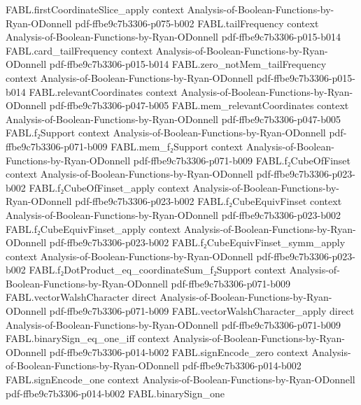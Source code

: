 \begin{theorem}
\proofstep
  {FABL.firstCoordinateSlice_apply}
  {context}
  {Analysis-of-Boolean-Functions-by-Ryan-ODonnell}
  {pdf-ffbe9c7b3306-p075-b002}
\proofstep
  {FABL.tailFrequency}
  {context}
  {Analysis-of-Boolean-Functions-by-Ryan-ODonnell}
  {pdf-ffbe9c7b3306-p015-b014}
\proofstep
  {FABL.card_tailFrequency}
  {context}
  {Analysis-of-Boolean-Functions-by-Ryan-ODonnell}
  {pdf-ffbe9c7b3306-p015-b014}
\proofstep
  {FABL.zero_notMem_tailFrequency}
  {context}
  {Analysis-of-Boolean-Functions-by-Ryan-ODonnell}
  {pdf-ffbe9c7b3306-p015-b014}
\proofstep
  {FABL.relevantCoordinates}
  {context}
  {Analysis-of-Boolean-Functions-by-Ryan-ODonnell}
  {pdf-ffbe9c7b3306-p047-b005}
\proofstep
  {FABL.mem_relevantCoordinates}
  {context}
  {Analysis-of-Boolean-Functions-by-Ryan-ODonnell}
  {pdf-ffbe9c7b3306-p047-b005}
\proofstep
  {FABL.f₂Support}
  {context}
  {Analysis-of-Boolean-Functions-by-Ryan-ODonnell}
  {pdf-ffbe9c7b3306-p071-b009}
\proofstep
  {FABL.mem_f₂Support}
  {context}
  {Analysis-of-Boolean-Functions-by-Ryan-ODonnell}
  {pdf-ffbe9c7b3306-p071-b009}
\proofstep
  {FABL.f₂CubeOfFinset}
  {context}
  {Analysis-of-Boolean-Functions-by-Ryan-ODonnell}
  {pdf-ffbe9c7b3306-p023-b002}
\proofstep
  {FABL.f₂CubeOfFinset_apply}
  {context}
  {Analysis-of-Boolean-Functions-by-Ryan-ODonnell}
  {pdf-ffbe9c7b3306-p023-b002}
\proofstep
  {FABL.f₂CubeEquivFinset}
  {context}
  {Analysis-of-Boolean-Functions-by-Ryan-ODonnell}
  {pdf-ffbe9c7b3306-p023-b002}
\proofstep
  {FABL.f₂CubeEquivFinset_apply}
  {context}
  {Analysis-of-Boolean-Functions-by-Ryan-ODonnell}
  {pdf-ffbe9c7b3306-p023-b002}
\proofstep
  {FABL.f₂CubeEquivFinset_symm_apply}
  {context}
  {Analysis-of-Boolean-Functions-by-Ryan-ODonnell}
  {pdf-ffbe9c7b3306-p023-b002}
\proofstep
  {FABL.f₂DotProduct_eq_coordinateSum_f₂Support}
  {context}
  {Analysis-of-Boolean-Functions-by-Ryan-ODonnell}
  {pdf-ffbe9c7b3306-p071-b009}
\proofstep
  {FABL.vectorWalshCharacter}
  {direct}
  {Analysis-of-Boolean-Functions-by-Ryan-ODonnell}
  {pdf-ffbe9c7b3306-p071-b009}
\proofstep
  {FABL.vectorWalshCharacter_apply}
  {direct}
  {Analysis-of-Boolean-Functions-by-Ryan-ODonnell}
  {pdf-ffbe9c7b3306-p071-b009}
\proofstep
  {FABL.binarySign_eq_one_iff}
  {context}
  {Analysis-of-Boolean-Functions-by-Ryan-ODonnell}
  {pdf-ffbe9c7b3306-p014-b002}
\proofstep
  {FABL.signEncode_zero}
  {context}
  {Analysis-of-Boolean-Functions-by-Ryan-ODonnell}
  {pdf-ffbe9c7b3306-p014-b002}
\proofstep
  {FABL.signEncode_one}
  {context}
  {Analysis-of-Boolean-Functions-by-Ryan-ODonnell}
  {pdf-ffbe9c7b3306-p014-b002}
\proofstep
  {FABL.binarySign_one}

\end{theorem}
